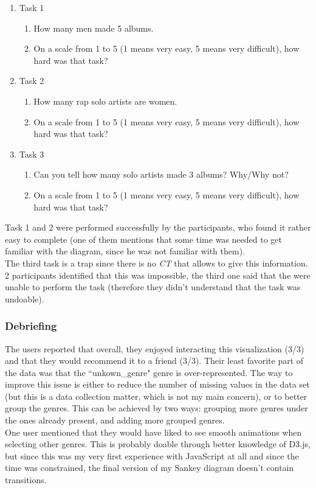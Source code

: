 \documentclass[a4paper, 11pt, oneside]{article}
\newcommand{\ct}{\textit{CT }}
\begin{document}
\begin{enumerate}
    \item Task 1
          \begin{enumerate}
              \item How many men made 5 albums.
              \item On a scale from 1 to 5 (1 means very easy, 5 means very difficult), how hard was that task?
          \end{enumerate}
    \item Task 2
          \begin{enumerate}
              \item How many rap solo artists are women.
              \item On a scale from 1 to 5 (1 means very easy, 5 means very difficult), how hard was that task?
          \end{enumerate}
    \item Task 3
          \begin{enumerate}
              \item Can you tell how many solo artists made 3 albums? Why/Why not?
              \item On a scale from 1 to 5 (1 means very easy, 5 means very difficult), how hard was that task?
          \end{enumerate}
\end{enumerate}
Task 1 and 2 were performed successfully by the participants, who found it rather easy to complete (one of them mentions that some time was needed to get familiar with the diagram, since he was not familiar with them). \\
The third task is a trap since there is no \ct that allows to give this information. 2 participants identified that this was impossible, the third one said that the were unable to perform the task (therefore they didn't understand that the task was undoable).

\subsubsection{Debriefing}
The users reported that overall, they enjoyed interacting this visualization (3/3) and that they would recommend it to a friend (3/3). Their least favorite part of the data was that the ``unkown\_genre" genre is over-represented. The way to improve this issue is either to reduce the number of missing values in the data set (but this is a data collection matter, which is not my main concern), or to better group the genres. This can be achieved by two ways: grouping more genres under the ones already present, and adding more grouped genres. \\
One user mentioned that they would have liked to see smooth animations when selecting other genres. This is probably doable through better knowledge of D3.js, but since this was my very first experience with JavaScript at all and since the time was constrained, the final version of my Sankey diagram doesn't contain transitions.
\end{document}
